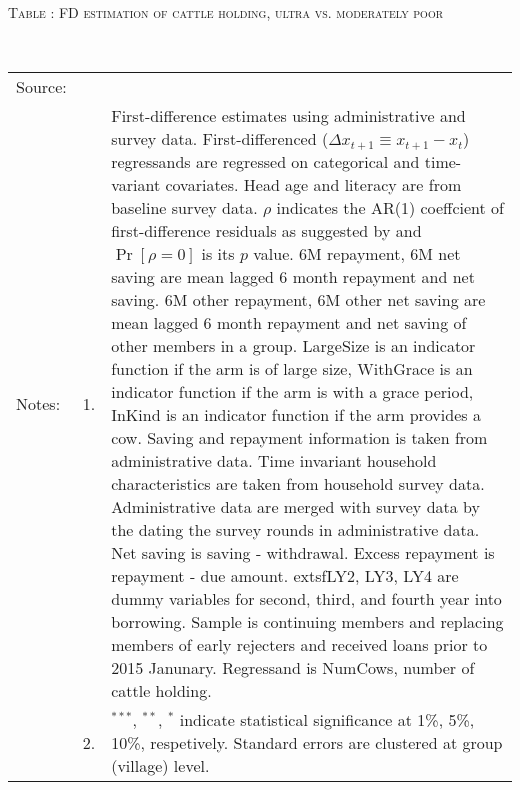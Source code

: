 \hspace{-1cm}\begin{minipage}[t]{14cm}
\hfil\textsc{\normalsize Table \thetable: FD estimation of cattle holding, ultra vs. moderately poor\label{tab FD NumCows poor original HH}}\\
\setlength{\tabcolsep}{1pt}
\setlength{\baselineskip}{8pt}
\renewcommand{\arraystretch}{.55}
\hfil{}\\
\renewcommand{\arraystretch}{.8}
\setlength{\tabcolsep}{1pt}
\begin{tabular}{>{\hfill\scriptsize}p{1cm}<{}>{\hfill\scriptsize}p{.25cm}<{}>{\scriptsize}p{12cm}<{\hfill}}
Source:& \multicolumn{2}{l}{\scriptsize Estimated with GUK administrative and survey data.}\\
Notes: & 1. & First-difference estimates using administrative and survey data. First-differenced ($\Delta x_{t+1}\equiv x_{t+1} - x_{t}$) regressands are regressed on categorical and time-variant covariates. Head age and literacy are from baseline survey data. $\rho$ indicates the AR(1) coeffcient of first-difference residuals as suggested by \citet[][10.71]{Wooldridge2010} and $\Pr[\rho=0]$ is its $p$ value. \textsf{6M repayment, 6M net saving} are mean lagged 6 month repayment and net saving. \textsf{6M other repayment, 6M other net saving} are mean lagged 6 month repayment and net saving of other members in a group. \textsf{LargeSize} is an indicator function if the arm is of large size, \textsf{WithGrace} is an indicator function if the arm is with a grace period, \textsf{InKind} is an indicator function if the arm provides a cow. Saving and repayment information is taken from administrative data. Time invariant household characteristics are taken from household survey data. Administrative data are merged with survey data by the dating the survey rounds in administrative data. Net saving is saving - withdrawal. Excess repayment is repayment - due amount. 	extsf{LY2, LY3, LY4} are dummy variables for second, third, and fourth year into borrowing. Sample is continuing members and replacing members of early rejecters and received loans prior to 2015 Janunary. Regressand is \textsf{NumCows}, number of cattle holding. \\
& 2. & ${}^{***}$, ${}^{**}$, ${}^{*}$ indicate statistical significance at 1\%, 5\%, 10\%, respetively. Standard errors are clustered at group (village) level.
\end{tabular}
\end{minipage}

